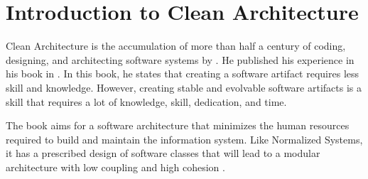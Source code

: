 \section{Introduction to Clean Architecture} \label{sec:into_ca}

Clean Architecture is the accumulation of more than half a century of coding, designing,
and architecting software systems by \citeauthor*[]{robert_c_martin_clean_2018}. He
published his experience in his book  in
\citeyear[]{robert_c_martin_clean_2018}. In this book, he states that creating a software
artifact requires less skill and knowledge. However, creating stable and evolvable
software artifacts is a skill that requires a lot of knowledge, skill, dedication, and
time.

The book aims for a software architecture that minimizes the human resources required to
build and maintain the information system. Like Normalized Systems, it has a
prescribed design of software classes that will lead to a modular architecture with low
coupling and high cohesion \parencite{robert_c_martin_clean_2018}.
